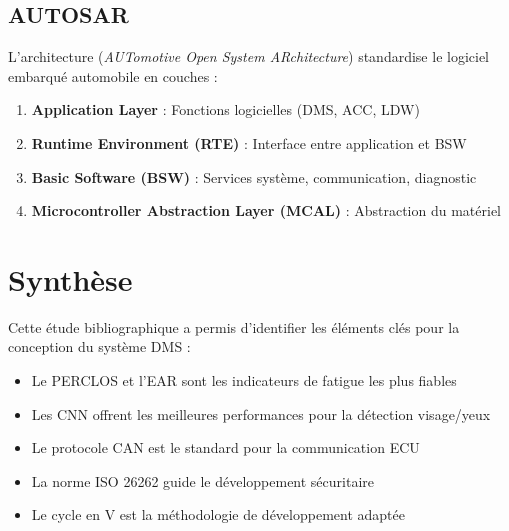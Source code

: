 \subsection{AUTOSAR}

L'architecture  \cite{autosar2022} (\textit{AUTomotive Open System ARchitecture}) standardise le logiciel embarqué automobile en couches :

\begin{enumerate}
    \item \textbf{Application Layer} : Fonctions logicielles (DMS, ACC, LDW)
    \item \textbf{Runtime Environment (RTE)} : Interface entre application et BSW
    \item \textbf{Basic Software (BSW)} : Services système, communication, diagnostic
    \item \textbf{Microcontroller Abstraction Layer (MCAL)} : Abstraction du matériel
\end{enumerate}

\section{Synthèse}

Cette étude bibliographique a permis d'identifier les éléments clés pour la conception du système DMS :
\begin{itemize}
    \item Le PERCLOS et l'EAR sont les indicateurs de fatigue les plus fiables
    \item Les CNN offrent les meilleures performances pour la détection visage/yeux
    \item Le protocole CAN est le standard pour la communication ECU
    \item La norme ISO 26262 guide le développement sécuritaire
    \item Le cycle en V est la méthodologie de développement adaptée
\end{itemize}
